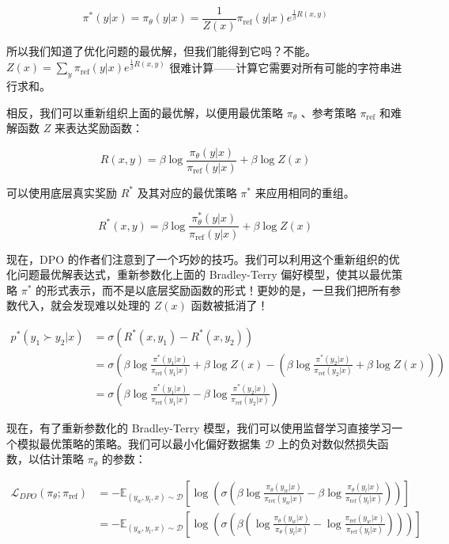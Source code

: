 \documentclass[lang=cn,newtx,10pt,scheme=chinese]{elegantbook}
\begin{document}
\begin{equation}
\pi^*(y|x)=\pi_\theta(y|x)=\frac{1}{Z(x)}\pi_\text{ref}(y|x)e^{\frac{1}{\beta}R(x,y)}
\end{equation}

所以我们知道了优化问题的最优解，但我们能得到它吗？不能。$Z(x)=\sum_y\pi_\text{ref}(y|x)e^{\frac{1}{\beta}R(x,y)}$ 很难计算——计算它需要对所有可能的字符串进行求和。

相反，我们可以重新组织上面的最优解，以便用最优策略 $\pi_\theta$ 、参考策略 $\pi_\text{ref}$ 和难解函数 $Z$ 来表达奖励函数：

\begin{equation}
R(x,y) = \beta\log\frac{\pi_\theta(y|x)}{\pi_\text{ref}(y|x)}+\beta\log Z(x)
\end{equation}

可以使用底层真实奖励 $R^*$ 及其对应的最优策略 $\pi^*$ 来应用相同的重组。

\begin{equation}
R^*(x,y) = \beta\log\frac{\pi^*_\theta(y|x)}{\pi_\text{ref}(y|x)}+\beta\log Z(x)
\end{equation}

现在，DPO 的作者们注意到了一个巧妙的技巧。我们可以利用这个重新组织的优化问题最优解表达式，重新参数化上面的 Bradley-Terry 偏好模型，使其以最优策略 $\pi^*$ 的形式表示，而不是以底层奖励函数的形式！更妙的是，一旦我们把所有参数代入，就会发现难以处理的 $Z(x)$ 函数被抵消了！

\begin{equation}
\begin{aligned}
p^*(y_1 \succ y_2 | x) &= \sigma(R^*(x,y_1)-R^*(x,y_2)) \\
&= \sigma\left({\beta\log\frac{\pi^*(y_1|x)}{\pi_\text{ref}(y_1|x)}} + \beta\log Z(x) - \left({{\beta\log\frac{\pi^*(y_2|x)}{\pi_\text{ref}(y_2|x)}} + \beta\log Z(x)}\right)\right) \\
&= \sigma\left({\beta\log\frac{\pi^*(y_1|x)}{\pi_\text{ref}(y_1|x)}-\beta\log\frac{\pi^*(y_2|x)}{\pi_\text{ref}(y_2|x)}}\right)
\end{aligned}
\end{equation}

现在，有了重新参数化的 Bradley-Terry 模型，我们可以使用监督学习直接学习一个模拟最优策略的策略。我们可以最小化偏好数据集 $\mathcal{D}$ 上的负对数似然损失函数，以估计策略 $\pi_\theta$ 的参数：

\begin{equation}
\begin{aligned}
\mathcal{L}_{DPO}(\pi_\theta;\pi_{\text{ref}}) &= -\mathbb{E}_{(y_w,y_l,x)\sim \mathcal{D}}\left[\log\left(\sigma\left(\beta\log{\frac{\pi_\theta(y_w|x)}{\pi_{\text{ref}}(y_w|x)}} - \beta\log{\frac{\pi_\theta(y_l|x)}{\pi_{\text{ref}}(y_l|x)}}\right)\right)\right] \\
&= -\mathbb{E}_{(y_w,y_l,x)\sim \mathcal{D}}\left[\log\left(\sigma\left(\beta\left(\log{\frac{\pi_\theta(y_w|x)}{\pi_\theta(y_l|x)}} - \log{\frac{\pi_{\text{ref}}(y_w|x)}{\pi_{\text{ref}}(y_l|x)}}\right)\right)\right)\right]
\end{aligned}
\end{equation}
\end{document}

